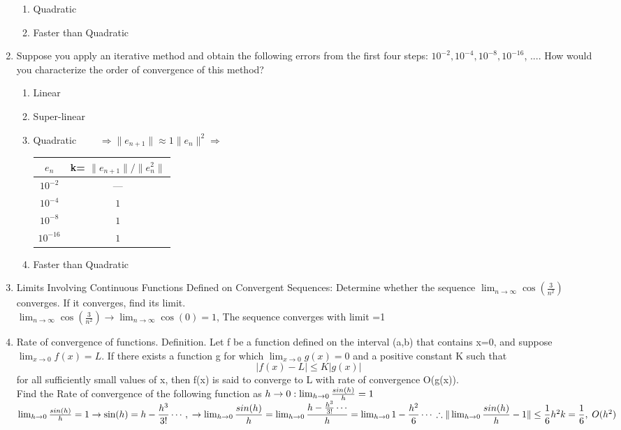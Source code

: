 \documentclass[a4paper,12pt]{article}
\begin{document}
\begin{enumerate}[label=(\alph*)]
\begin{enumerate}[label=(\Alph*)]
\item Quadratic
\item Faster than Quadratic
\end{enumerate}
\newpage
\item Suppose you apply an iterative method and obtain the following errors from the first four steps: $10^{-2}, 10^{-4}, 10^{-8}, 10^{-16}$, .... How would you characterize the order of convergence of this method?
\begin{enumerate}[label=(\Alph*)]
\item Linear
\item Super-linear
\item {\color{blue} Quadratic $\qquad  \Rightarrow \| e_{n+1}\| \approx 1 \|e_{n}\|^2  \Rightarrow $\begin{tabular}{|c|c|}
\hline 
$e_{n}$ & k= $\|e_{n+1}\|/\|e_{n}^2\|$ \\ 
\hline 
$10^{-2}$ & --- \\ 
\hline 
$10^{-4}$ & $1$ \\ 
\hline 
$10^{-8}$ & $1$ \\ 
\hline 
$10^{-16}$ & $1$ \\ 
\hline 
\end{tabular}}
\item Faster than Quadratic
\end{enumerate}
\item Limits Involving Continuous Functions Defined on Convergent Sequences: Determine whether the sequence $\lim_{n \to \infty } \cos (\frac{3}{n^2})$	 converges. If it converges, find its limit.\\
{\color{blue}{\Large Solution:} $\lim_{n \to \infty } \cos (\frac{3}{n^2})\rightarrow \lim_{n \to \infty } \cos (0) = 1$, The sequence converges with limit =1 }
\item Rate of convergence of functions. Definition. Let f be a function defined on the interval (a,b) that contains x=0, and suppose $\lim_{x \to 0 } f(x) = L$. If there exists a function g for which $\lim_{x \to 0 } g(x) = 0$ and a positive constant K such that \[ |f(x) -L | \le  K|g(x)| \] for all sufficiently small values of x, then f(x) is said to converge to L with rate of convergence O(g(x)).\\
Find the Rate of convergence of the following function as $h \rightarrow 0 : \lim_{h \to 0} {sin(h)\over h} =1$\\
{\color{blue}{\Large Solution:} $\lim_{h \to 0} {sin(h)\over h} =1 \rightarrow \sin(h) =h - \dfrac{h^3}{ 3!} \cdots ,\\ \rightarrow \lim_{h \to 0} \dfrac{sin(h)}{h} = \lim_{h \to 0} \dfrac{h - {h^3 \over 3!} \cdots }{h} =\lim_{h \to 0} 1-\dfrac{h^2}{6} \cdots \\ \therefore \| \lim_{h \to 0} \dfrac{sin(h)}{h} - 1 \| \le \dfrac{1}{6} h^2\\ k = \dfrac{1}{6},\; O(h^2) $}

\end{enumerate}
\end{document}
